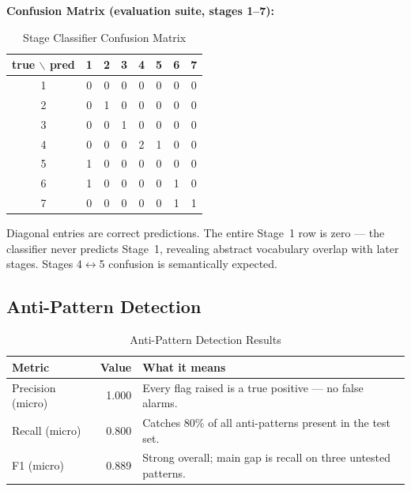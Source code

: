 \documentclass[12pt,a4paper]{article}
\begin{document}
\textbf{Confusion Matrix (evaluation suite, stages 1--7):}

\begin{table}[h!]
\centering
\caption{Stage Classifier Confusion Matrix}
\begin{tabular}{c|ccccccc}
\toprule
true $\backslash$ pred & 1 & 2 & 3 & 4 & 5 & 6 & 7 \\
\midrule
1 & 0 & 0 & 0 & 0 & 0 & 0 & 0 \\
2 & 0 & 1 & 0 & 0 & 0 & 0 & 0 \\
3 & 0 & 0 & 1 & 0 & 0 & 0 & 0 \\
4 & 0 & 0 & 0 & 2 & 1 & 0 & 0 \\
5 & 1 & 0 & 0 & 0 & 0 & 0 & 0 \\
6 & 1 & 0 & 0 & 0 & 0 & 1 & 0 \\
7 & 0 & 0 & 0 & 0 & 0 & 1 & 1 \\
\bottomrule
\end{tabular}
\end{table}

Diagonal entries are correct predictions. The entire Stage~1 row is zero --- the classifier never predicts Stage~1, revealing abstract vocabulary overlap with later stages. Stages 4$\leftrightarrow$5 confusion is semantically expected.

\subsection{Anti-Pattern Detection}

\begin{table}[h!]
\centering
\caption{Anti-Pattern Detection Results}
\begin{tabular}{lrl}
\toprule
Metric & Value & What it means \\
\midrule
Precision (micro) & 1.000 & Every flag raised is a true positive --- no false alarms. \\
Recall (micro) & 0.800 & Catches 80\% of all anti-patterns present in the test set. \\
F1 (micro) & 0.889 & Strong overall; main gap is recall on three untested patterns. \\
\bottomrule
\end{tabular}
\end{table}
\end{document}
